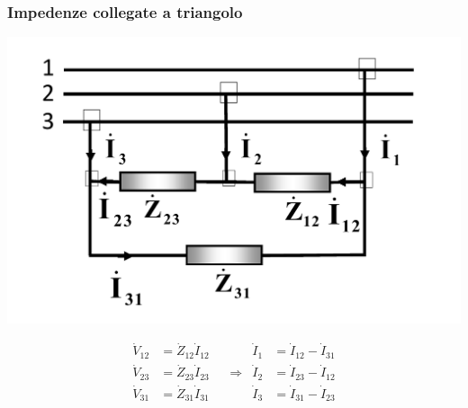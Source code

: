 \documentclass{article}
\begin{document}
\subsubsection{Impedenze collegate a triangolo}
\begin{center}
    \includegraphics[scale=0.27]{Image/Impedenze_collegate_a_triangolo_1.png}
\end{center}
\begin{align*}
    \dot V_{12} &= \dot Z_{12} \dot I_{12} & & 
    &
    \dot I_1 &= \dot I_{12} - \dot I_{31}
    \\
    \dot V_{23} &= \dot Z_{23} \dot I_{23}
    & 
    &\Longrightarrow 
    &
    \dot I_2 &= \dot I_{23} - \dot I_{12}
    \\
    \dot  V_{31} &= \dot Z_{31} \dot I_{31}
    & &
    &
    \dot I_3 &= \dot I_{31} - \dot I_{23}
\end{align*}
\end{document}
